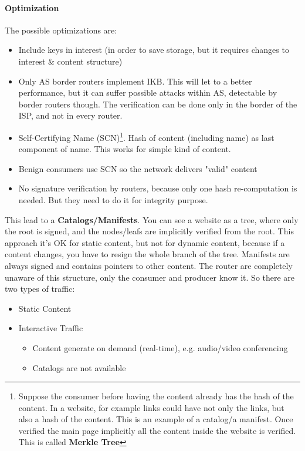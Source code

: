 \paragraph*{Optimization} The possible optimizations are:
\begin{itemize}
  \item Include keys in interest (in order to save storage, but it requires
changes to interest & content structure)
  \item Only AS border routers implement IKB. This will let to a better
performance, but it can suffer possible attacks within AS, detectable by
border routers though. The verification can be done only in the border of the
ISP, and not in every router.
  \item Self-Certifying Name (SCN)\footnote{Suppose the consumer before having
the content already has the hash of the content. In a website, for example
links could have not only the links, but also a hash of the content. This is an
example of a catalog/a manifest. Once verified the main page implicitly all the
content inside the website is verified. This is called \textbf{Merkle Tree}}.
Hash of content (including name) as last component of name. This works for
simple kind of content.
  \item Benign consumers use SCN so the network delivers "valid" content
  \item No signature verification by routers, because only one hash
re-computation is needed. But they need to do it for integrity purpose.
\end{itemize}

This lead to a \textbf{Catalogs/Manifests}. You can see a website as a tree,
where only the root is signed, and the nodes/leafs are implicitly verified from
the root. This approach it's OK for static content, but not for dynamic
content, because if a content changes, you have to resign the whole branch of
the tree.
Manifests are always signed and contains pointers to other content. The router
are completely unaware of this structure, only the consumer and producer know
it.
So there are two types of traffic:
\begin{itemize}
  \item Static Content
  \item Interactive Traffic
  \begin{itemize}
    \item Content generate on demand (real-time), e.g. audio/video conferencing
    \item Catalogs are not available
  \end{itemize}
\end{itemize}

